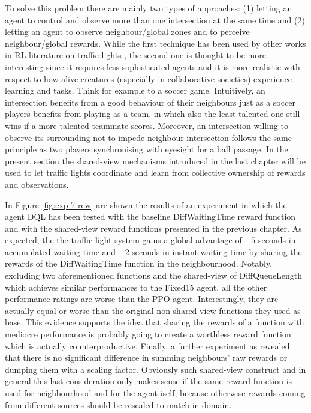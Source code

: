 To solve this problem there are mainly two types of approaches: (1) letting an agent to control and observe more than one intersection at the same time and (2) letting an agent to observe neighbour/global zones and to perceive neighbour/global rewards.
While the first technique has been used by other works in RL literature on traffic lights \cite{wei2019presslight}, the second one is thought to be more interesting since it requires less sophisticated agents and it is more realistic with respect to how alive creatures (especially in collaborative societies) experience learning and tasks. Think for example to a soccer game.
Intuitively, an intersection benefits from a good behaviour of their neighbours just as a soccer players benefits from playing as a team, in which also the least talented one still wins if a more talented teammate scores.
Moreover, an intersection willing to observe its surrounding not to impede neighbour intersection follows the same principle as two players synchronising with eyesight for a ball passage.
In the present section the shared-view mechanisms introduced in the last chapter will be used to let traffic lights coordinate and learn from collective ownership of rewards and observations.

In Figure \ref{fig:exp-7-rew} are shown the results of an experiment in which the agent DQL has been tested with the baseline DiffWaitingTime reward function and with the shared-view reward functions presented in the previous chapter.
As expected, the the traffic light system gains a global advantage of $-5$ seconds in accumulated waiting time and $-2$ seconds in instant waiting time by sharing the rewards of the DiffWaitingTime function in the neighbourhood.
Notably, excluding two aforementioned functions and the shared-view of DiffQueueLength which achieves similar performances to the Fixed15 agent, all the other performance ratings are worse than the PPO agent.
Interestingly, they are actually equal or worse than the original non-shared-view functions they used as base.
This evidence supports the idea that sharing the rewards of a function with mediocre performance is probably going to create a worthless reward function which is actually counterproductive.
Finally, a further experiment as revealed that there is no significant difference in summing neighbours' raw rewards or dumping them with a scaling factor.
Obviously such shared-view construct and in general this last consideration only makes sense if the same reward function is used for neighbourhood and for the agent iself, because otherwise rewards coming from different sources should be rescaled to match in domain.

